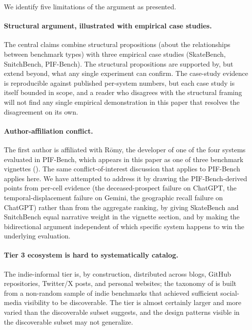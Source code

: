 \documentclass[11pt,a4paper]{article}
\begin{document}
We identify five limitations of the argument as presented.

\paragraph{Structural argument, illustrated with empirical case studies.} The central claims combine structural propositions (about the relationships between benchmark types) with three empirical case studies (SkateBench, SnitchBench, PIF-Bench). The structural propositions are supported by, but extend beyond, what any single experiment can confirm. The case-study evidence is reproducible against published per-system numbers, but each case study is itself bounded in scope, and a reader who disagrees with the structural framing will not find any single empirical demonstration in this paper that resolves the disagreement on its own.

\paragraph{Author-affiliation conflict.} The first author is affiliated with R\={o}my, the developer of one of the four systems evaluated in PIF-Bench, which appears in this paper as one of three benchmark vignettes (). The same conflict-of-interest discussion that applies to PIF-Bench \citep{lijo2026pifbench} applies here. We have attempted to address it by drawing the PIF-Bench-derived points from per-cell evidence (the deceased-prospect failure on ChatGPT, the temporal-displacement failure on Gemini, the geographic recall failure on ChatGPT) rather than from the aggregate ranking, by giving SkateBench and SnitchBench equal narrative weight in the vignette section, and by making the bidirectional argument independent of which specific system happens to win the underlying evaluation.

\paragraph{Tier 3 ecosystem is hard to systematically catalog.} The indie-informal tier is, by construction, distributed across blogs, GitHub repositories, Twitter/X posts, and personal websites; the taxonomy of  is built from a non-random sample of indie benchmarks that achieved sufficient social-media visibility to be discoverable. The tier is almost certainly larger and more varied than the discoverable subset suggests, and the design patterns visible in the discoverable subset may not generalize.
\end{document}
